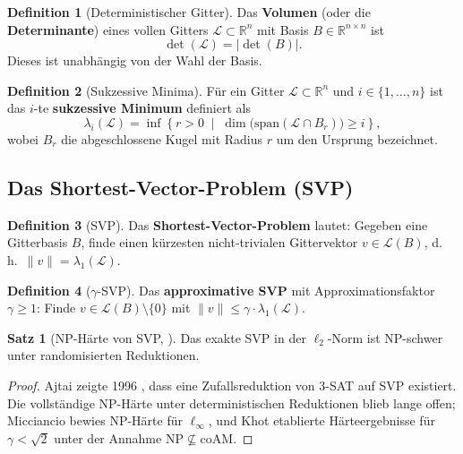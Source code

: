 ﻿\documentclass[a4paper,12pt]{article}
\theoremstyle{definition}
\newtheorem{definition}{Definition}[section]
\newtheorem{satz}{Satz}[section]
\begin{document}
\begin{definition}[Deterministischer Gitter]
Das \textbf{Volumen} (oder die \textbf{Determinante}) eines vollen Gitters
$\mathcal{L} \subset \mathbb{R}^n$ mit Basis $B \in \mathbb{R}^{n \times n}$ ist
\[
  \det(\mathcal{L}) = |\det(B)|.
\]
Dieses ist unabhängig von der Wahl der Basis.
\end{definition}

\begin{definition}[Sukzessive Minima]
Für ein Gitter $\mathcal{L} \subset \mathbb{R}^n$ und $i \in \{1, \ldots, n\}$
ist das $i$-te \textbf{sukzessive Minimum} definiert als
\[
  \lambda_i(\mathcal{L}) = \inf \left\{ r > 0 \;\middle|\; \dim\bigl(\mathrm{span}(\mathcal{L} \cap B_r)\bigr) \geq i \right\},
\]
wobei $B_r$ die abgeschlossene Kugel mit Radius $r$ um den Ursprung bezeichnet.
\end{definition}

\subsection{Das Shortest-Vector-Problem (SVP)}

\begin{definition}[SVP]
Das \textbf{Shortest-Vector-Problem} lautet: Gegeben eine Gitterbasis $B$,
finde einen kürzesten nicht-trivialen Gittervektor $v \in \mathcal{L}(B)$,
d.\,h.\ $\|v\| = \lambda_1(\mathcal{L})$.
\end{definition}

\begin{definition}[$\gamma$-SVP]
Das \textbf{approximative SVP} mit Approximationsfaktor $\gamma \geq 1$:
Finde $v \in \mathcal{L}(B) \setminus \{0\}$ mit $\|v\| \leq \gamma \cdot \lambda_1(\mathcal{L})$.
\end{definition}

\begin{satz}[NP-Härte von SVP, \cite{Aro97}]
Das exakte SVP in der $\ell_2$-Norm ist NP-schwer unter randomisierten Reduktionen.
\end{satz}

\begin{proof}
Ajtai zeigte 1996 \cite{Ajt96}, dass eine Zufallsreduktion von 3-SAT auf SVP existiert.
Die vollständige NP-Härte unter deterministischen Reduktionen blieb lange offen;
Micciancio \cite{Mic01} bewies NP-Härte für $\ell_\infty$, und Khot \cite{Kho05}
etablierte Härteergebnisse für $\gamma < \sqrt{2}$ unter der Annahme $\mathrm{NP} \not\subseteq \mathrm{coAM}$.
\end{proof}
\end{document}
